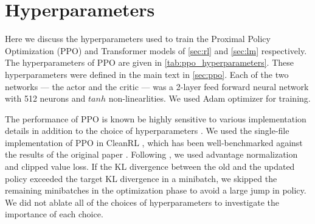 
\section{Hyperparameters}\label{app:hyperparameters}

Here we discuss the hyperparameters used to train the Proximal Policy Optimization (PPO) and Transformer models of \autoref{sec:rl} and \autoref{sec:lm} respectively. 
The hyperparameters of PPO are given in \autoref{tab:ppo_hyperparameters}. These hyperparameters were defined in the main text in \autoref{sec:ppo}. Each of the two networks --- the actor and the critic --- was a 2-layer feed forward neural network with 512 neurons and $tanh$ non-linearlities. We used Adam optimizer for training. 
\newline 

The performance of PPO is known be highly sensitive to various implementation details in addition to the choice of hyperparameters \cite{shengyi2022the37implementation, engstrom2020implementation}. We used the single-file implementation of PPO in CleanRL \cite{huang2022cleanrl}, which has been well-benchmarked against the results of the original paper \cite{schulman2017proximal}. Following  \cite{engstrom2020implementation}, we used advantage normalization and clipped value loss. If the KL divergence between the old and the updated policy exceeded the target KL divergence in a minibatch, we skipped the remaining minibatches in the optimization phase to avoid a large jump in policy. 
We did not ablate all of the choices of hyperparameters to investigate the importance of each choice.

